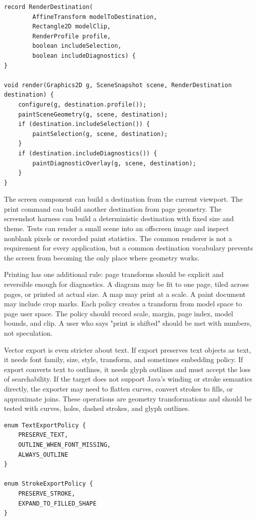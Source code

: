 \begin{lstlisting}[caption={Destination frames separate screen paint from export paint.}]
record RenderDestination(
        AffineTransform modelToDestination,
        Rectangle2D modelClip,
        RenderProfile profile,
        boolean includeSelection,
        boolean includeDiagnostics) {
}

void render(Graphics2D g, SceneSnapshot scene, RenderDestination destination) {
    configure(g, destination.profile());
    paintSceneGeometry(g, scene, destination);
    if (destination.includeSelection()) {
        paintSelection(g, scene, destination);
    }
    if (destination.includeDiagnostics()) {
        paintDiagnosticOverlay(g, scene, destination);
    }
}
\end{lstlisting}

The screen component can build a destination from the current viewport. The print command can build another destination from page geometry. The screenshot harness can build a deterministic destination with fixed size and theme. Tests can render a small scene into an offscreen image and inspect nonblank pixels or recorded paint statistics. The common renderer is not a requirement for every application, but a common destination vocabulary prevents the screen from becoming the only place where geometry works.

Printing has one additional rule: page transforms should be explicit and reversible enough for diagnostics. A diagram may be fit to one page, tiled across pages, or printed at actual size. A map may print at a scale. A paint document may include crop marks. Each policy creates a transform from model space to page user space. The policy should record scale, margin, page index, model bounds, and clip. A user who says "print is shifted" should be met with numbers, not speculation.

Vector export is even stricter about text. If export preserves text objects as text, it needs font family, size, style, transform, and sometimes embedding policy. If export converts text to outlines, it needs glyph outlines and must accept the loss of searchability. If the target does not support Java's winding or stroke semantics directly, the exporter may need to flatten curves, convert strokes to fills, or approximate joins. These operations are geometry transformations and should be tested with curves, holes, dashed strokes, and glyph outlines.

\begin{lstlisting}[caption={Export policy is explicit, not a side effect of paint.}]
enum TextExportPolicy {
    PRESERVE_TEXT,
    OUTLINE_WHEN_FONT_MISSING,
    ALWAYS_OUTLINE
}

enum StrokeExportPolicy {
    PRESERVE_STROKE,
    EXPAND_TO_FILLED_SHAPE
}
\end{lstlisting}

